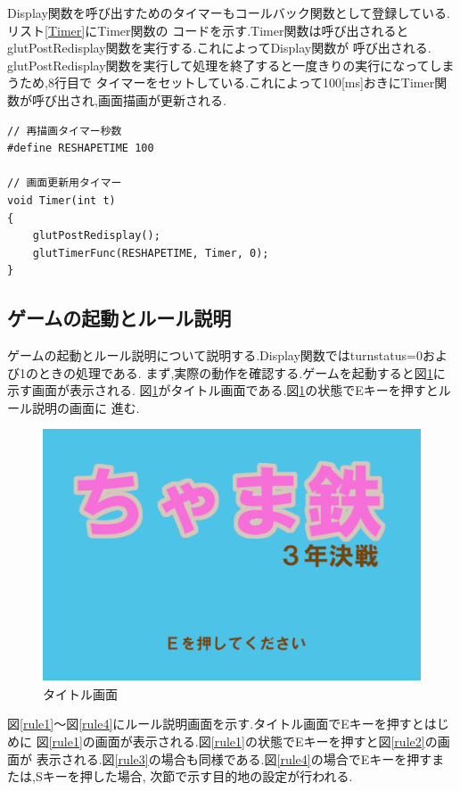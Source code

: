 \documentclass[a4j]{jarticle}
\begin{document}
    Display関数を呼び出すためのタイマーもコールバック関数として登録している.リスト\ref{Timer}にTimer関数の
    コードを示す.Timer関数は呼び出されるとglutPostRedisplay関数を実行する.これによってDisplay関数が
    呼び出される. glutPostRedisplay関数を実行して処理を終了すると一度きりの実行になってしまうため,8行目で
    タイマーをセットしている.これによって100[ms]おきにTimer関数が呼び出され,画面描画が更新される.
    \begin{lstlisting}[basicstyle=\ttfamily\footnotesize, frame=single,label=Timer,caption=Timer関数]
// 再描画タイマー秒数
#define RESHAPETIME 100

// 画面更新用タイマー
void Timer(int t)
{
    glutPostRedisplay();
    glutTimerFunc(RESHAPETIME, Timer, 0);
}
                        \end{lstlisting}    

    \subsection{ゲームの起動とルール説明}
    ゲームの起動とルール説明について説明する.Display関数ではturnstatus=0および1のときの処理である.
    まず,実際の動作を確認する.ゲームを起動すると図\ref{title}に示す画面が表示される.
    図\ref{title}がタイトル画面である.図\ref{title}の状態でEキーを押すとルール説明の画面に
    進む.
    \begin{figure}[H]
        \centering
        \includegraphics[scale=2.0]{sp4.png}
        \caption{タイトル画面}
         \label{title}
        \end{figure}

    図\ref{rule1}～図\ref{rule4}にルール説明画面を示す.タイトル画面でEキーを押すとはじめに
    図\ref{rule1}の画面が表示される.図\ref{rule1}の状態でEキーを押すと図\ref{rule2}の画面が
    表示される.図\ref{rule3}の場合も同様である.図\ref{rule4}の場合でEキーを押すまたは,Sキーを押した場合,
    次節で示す目的地の設定が行われる.
\end{document}
